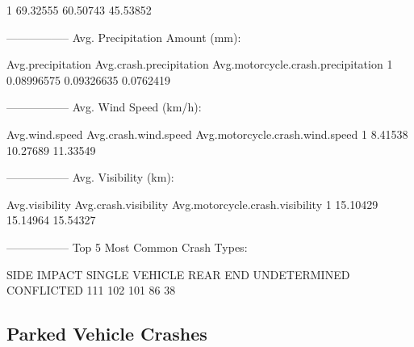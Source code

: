 \documentclass[11pt, a4paper]{article}
\begin{document}
\begin{Schunk}
\begin{Soutput}
1     69.32555           60.50743                      45.53852
\end{Soutput}
\begin{Soutput}
-----------------
Avg. Precipitation Amount (mm):
\end{Soutput}
\begin{Soutput}
  Avg.precipitation Avg.crash.precipitation Avg.motorcycle.crash.precipitation
1        0.08996575              0.09326635                          0.0762419
\end{Soutput}
\begin{Soutput}
-----------------
Avg. Wind Speed (km/h):
\end{Soutput}
\begin{Soutput}
  Avg.wind.speed Avg.crash.wind.speed Avg.motorcycle.crash.wind.speed
1        8.41538             10.27689                        11.33549
\end{Soutput}
\begin{Soutput}
-----------------
Avg. Visibility (km):
\end{Soutput}
\begin{Soutput}
  Avg.visibility Avg.crash.visibility Avg.motorcycle.crash.visibility
1       15.10429             15.14964                        15.54327
\end{Soutput}
\begin{Soutput}
-----------------
Top 5 Most Common Crash Types:
\end{Soutput}
\begin{Soutput}
   SIDE IMPACT SINGLE VEHICLE       REAR END   UNDETERMINED     CONFLICTED 
           111            102            101             86             38 
\end{Soutput}
\end{Schunk}



\pagebreak
\subsection{Parked Vehicle Crashes}
\end{document}
